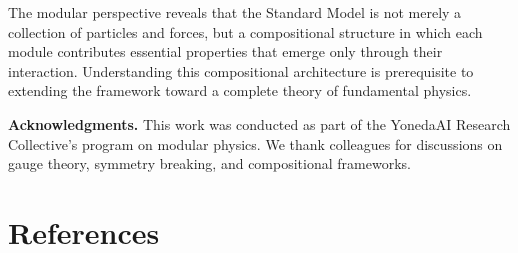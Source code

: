 \documentclass[12pt]{article}
\theoremstyle{definition}
\theoremstyle{remark}
\begin{document}
The modular perspective reveals that the Standard Model is not merely a collection of particles and forces, but a compositional structure in which each module contributes essential properties that emerge only through their interaction. Understanding this compositional architecture is prerequisite to extending the framework toward a complete theory of fundamental physics.

\bigskip

\noindent\textbf{Acknowledgments.}
This work was conducted as part of the YonedaAI Research Collective's program on modular physics. We thank colleagues for discussions on gauge theory, symmetry breaking, and compositional frameworks.


\section*{References}
\end{document}
